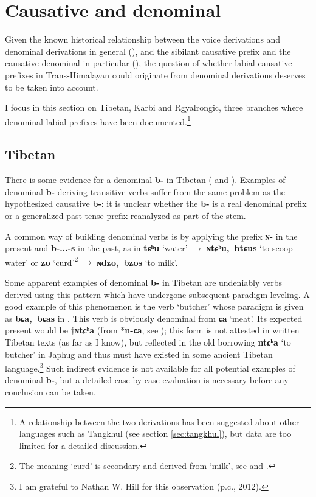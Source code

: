 \documentclass[oneside,a4paper,11pt]{article}
\newcommand{\ipa}[1]{\textbf{{\phon\mbox{#1}}}} %
\newcommand{\forme}[2]{\ipa{#1} `#2'}
\begin{document}
\section{Causative and denominal} \label{sec:denominal}
Given the known historical relationship between the voice derivations and denominal derivations in general (\citealt{jacques14antipassive}), and the sibilant causative prefix and the causative denominal in particular (\citealt{jacques15causative}), the question of whether labial causative prefixes in Trans-Himalayan could originate from denominal derivations deserves to be taken into account.

I focus in this section on Tibetan, Karbi and Rgyalrongic, three branches where denominal labial prefixes have been documented.\footnote{A relationship between the two derivations has been suggested about other languages such as Tangkhul (see section \ref{sec:tangkhul}), but data are too limited for a detailed discussion.  }

\subsection{Tibetan} \label{sec:tib.denom}
There is some evidence for a denominal \ipa{b-} in Tibetan (\citealt[100]{mazo04st} and \citealt[250-1]{zhang09cizu}). Examples of denominal \ipa{b-} deriving transitive verbs suffer from the same problem as the hypothesized causative \ipa{b-}: it is unclear whether the \ipa{b-} is a real denominal prefix or a generalized past tense prefix reanalyzed as part of the stem.

A common way of building denominal verbs is by applying the prefix \ipa{ɴ-} in the present and \ipa{b-...-s} in the past, as in \forme{tɕʰu}{water} $\rightarrow$ \forme{ɴtɕʰu, btɕus}{to scoop water} or \forme{ʑo}{curd}\footnote{The meaning `curd' is secondary and derived from `milk', see \citet[29-30]{jacques14esquisse} and \citet{tournadre15chocha}.} $\rightarrow$ \forme{ɴdʑo, bʑos}{to milk}.

Some apparent examples of denominal \ipa{b-} in Tibetan are undeniably verbs derived using this pattern which have undergone subsequent paradigm leveling. A good example of this phenomenon is the verb `butcher' whose paradigm is given as \ipa{bɕa, bɕas} in \citet{bodrgya}. This verb is obviously denominal from \forme{ɕa}{meat}. Its expected present would be $\dagger$\ipa{ɴtɕʰa} (from *\ipa{n-ɕa}, see \citealt{lifk33}); this form is not attested in written Tibetan texts (as far as I know), but reflected in the old borrowing \forme{ntɕʰa}{to butcher} in Japhug and thus must have existed in some ancient Tibetan language.\footnote{I am grateful to Nathan W. Hill for this observation (p.c., 2012).} Such indirect evidence is not available for all potential examples of denominal \ipa{b-}, but a detailed case-by-case evaluation is necessary before any conclusion can be taken.
\end{document}
